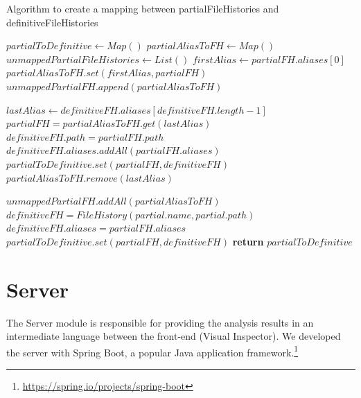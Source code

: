 \begin{algorithm}
    \caption{Algorithm to create a mapping between partialFileHistories and definitiveFileHistories}
    \label{algo:mapping}
    \begin{algorithmic}[1]
        \State $partialToDefinitive \gets Map()$
        \State $partialAliasToFH \gets Map()$ 
        \State $unmappedPartialFileHistories \gets List()$  
            \State $firstAlias \gets partialFH.aliases[0]$
                \State $partialAliasToFH.set(firstAlias, partialFH)$  
            \Else
                \State $unmappedPartialFH.append(partialAliasToFH)$  
            \EndIf
        \EndFor

         
            \State $lastAlias \gets definitiveFH.aliases[definitiveFH.length - 1]$
                \State $partialFH = partialAliasToFH.get(lastAlias)$
                \State $definitiveFH.path = partialFH.path$
                \State $definitiveFH.aliases.addAll(partialFH.aliases)$
                \State $partialToDefinitive.set(partialFH, definitiveFH)$
                \State $partialAliasToFH.remove(lastAlias)$
            \EndIf
        \EndFor

        \State $unmappedPartialFH.addAll(partialAliasToFH)$ 
            \State $definitiveFH = FileHistory(partial.name, partial.path)$
            \State $definitiveFH.aliases = partialFH.aliases $
            \State $partialToDefinitive.set(partialFH, definitiveFH)$
        \EndFor
        \State \textbf{return} $partialToDefinitive$
    \EndProcedure
    \end{algorithmic}
\end{algorithm}


\section{Server}
The Server module is responsible for providing the analysis results in an intermediate language between the 
front-end (Visual Inspector). We developed the server with Spring Boot, a popular Java application framework.\footnote{\url{https://spring.io/projects/spring-boot}}

